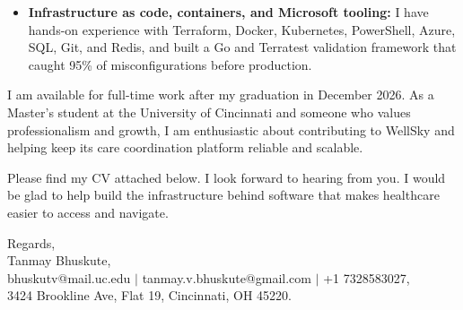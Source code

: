 \documentclass[11pt]{letter}
\begin{document}
\begin{letter}{}
\begin{itemize}[leftmargin=*, itemsep=0.45em]
    \item \textbf{Infrastructure as code, containers, and Microsoft tooling:} I have hands-on experience with Terraform, Docker, Kubernetes, PowerShell, Azure, SQL, Git, and Redis, and built a Go and Terratest validation framework that caught 95\% of misconfigurations before production.
\end{itemize}

I am available for full-time work after my graduation in December 2026. As a Master's student at the University of Cincinnati and someone who values professionalism and growth, I am enthusiastic about contributing to WellSky and helping keep its care coordination platform reliable and scalable.

Please find my CV attached below. I look forward to hearing from you. I would be glad to help build the infrastructure behind software that makes healthcare easier to access and navigate.

{\setlength{\parskip}{0pt}
Regards,\\
Tanmay Bhuskute,\\
bhuskutv@mail.uc.edu $\mid$ tanmay.v.bhuskute@gmail.com $\mid$ +1 7328583027,\\
3424 Brookline Ave, Flat 19, Cincinnati, OH 45220.
}

\end{letter}
\end{document}
